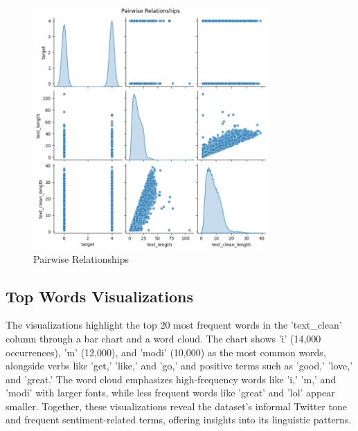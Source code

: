 \begin{figure}[H]
    \centering
    \includegraphics[width=0.8\textwidth]{img/visualize_pic/pairwise.png}
    \caption{Pairwise Relationships}
\end{figure}

\subsection{Top Words Visualizations}

The visualizations highlight the top 20 most frequent words in the 'text\_clean' column through a bar chart and a word cloud. The chart shows 'i' (14,000 occurrences), 'm' (12,000), and 'modi' (10,000) as the most common words, alongside verbs like 'get,' 'like,' and 'go,' and positive terms such as 'good,' 'love,' and 'great.' The word cloud emphasizes high-frequency words like 'i,' 'm,' and 'modi' with larger fonts, while less frequent words like 'great' and 'lol' appear smaller. Together, these visualizations reveal the dataset's informal Twitter tone and frequent sentiment-related terms, offering insights into its linguistic patterns.

